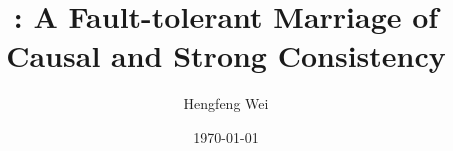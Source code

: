 \documentclass[]{beamer}
\title[\unistore]{\unistore: A Fault-tolerant Marriage of \\
  Causal and Strong Consistency}
\subtitle{\teal{(submitted to ATC'2021)}}
\author[Hengfeng Wei]{Hengfeng Wei}
\institute{hfwei@nju.edu.cn}
\date{\today}
\begin{document}
\maketitle






\thankyou{}
\end{document}
